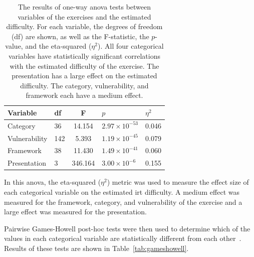 \begin{table}
    \centering
    \caption[\Gls{anova} test results for 2PL model]{The results of one-way \gls{anova} tests between variables of the exercises and the estimated difficulty. For each variable, the degrees of freedom (df) are shown, as well as the F-statistic, the $p$-value, and the eta-squared ($\eta^2$). All four categorical variables have statistically significant correlations with the estimated difficulty of the exercise. The presentation has a large effect on the estimated difficulty. The category, vulnerability, and framework each have a medium effect.}
    \setcellgapes{4pt}\makegapedcells
    \begin{tabular}{l l S[table-format=3.3] l l}
Variable & df & F & $p$ & $\eta^2$ \\
    \hline
    Category & 36 & 14.154 & $2.97 \times 10^{-53}$ & 0.046 \\
    Vulnerability & 142 & 5.393 & $1.19 \times 10^{-45}$ & 0.079 \\
    Framework & 38 & 11.430 & $ 1.49 \times 10^{-41}$ & 0.060 \\
    Presentation & 3 & 346.164 & $3.00 \times 10^{-6}$ & 0.155 \\
    \end{tabular}
    \label{tab:anova1}
\end{table}

In this \gls{anova}, the eta-squared ($\eta^2$) metric was used to measure the effect size of each categorical variable on the estimated \gls{irt} difficulty.
A medium effect was measured for the framework, category, and vulnerability of the exercise and a large effect was measured for the presentation.

Pairwise Games-Howell post-hoc tests were then used to determine which of the values in each categorical variable are statistically different from each other~\cite{games1976pairwise}.
Results of these tests are shown in Table~\ref{tab:gameshowell}.

